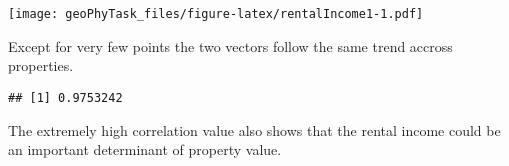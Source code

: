\documentclass[]{article}
\newenvironment{Shaded}{\begin{snugshade}}{\end{snugshade}}
\newcommand{\KeywordTok}[1]{\textcolor[rgb]{0.13,0.29,0.53}{\textbf{#1}}}
\newcommand{\OperatorTok}[1]{\textcolor[rgb]{0.81,0.36,0.00}{\textbf{#1}}}
\newcommand{\NormalTok}[1]{#1}
\begin{document}
\texttt{[image: geoPhyTask\_files/figure-latex/rentalIncome1-1.pdf]}

Except for very few points the two vectors follow the same trend accross
properties.

\begin{Shaded}
\end{Shaded}

\begin{verbatim}
## [1] 0.9753242
\end{verbatim}

The extremely high correlation value also shows that the rental income
could be an important determinant of property value.
\end{document}
